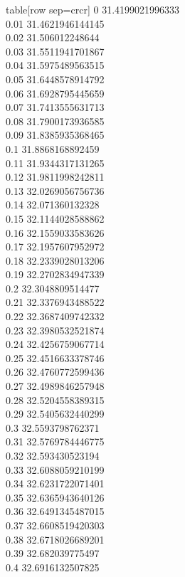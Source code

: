   table[row sep=crcr]{%
0	31.4199021996333\\
0.01	31.4621946144145\\
0.02	31.506012248644\\
0.03	31.5511941701867\\
0.04	31.5975489563515\\
0.05	31.6448578914792\\
0.06	31.6928795445659\\
0.07	31.7413555631713\\
0.08	31.7900173936585\\
0.09	31.8385935368465\\
0.1	31.8868168892459\\
0.11	31.9344317131265\\
0.12	31.9811998242811\\
0.13	32.0269056756736\\
0.14	32.071360132328\\
0.15	32.1144028588862\\
0.16	32.1559033583626\\
0.17	32.1957607952972\\
0.18	32.2339028013206\\
0.19	32.2702834947339\\
0.2	32.3048809514477\\
0.21	32.3376943488522\\
0.22	32.3687409742332\\
0.23	32.3980532521874\\
0.24	32.4256759067714\\
0.25	32.4516633378746\\
0.26	32.4760772599436\\
0.27	32.4989846257948\\
0.28	32.5204558389315\\
0.29	32.5405632440299\\
0.3	32.5593798762371\\
0.31	32.5769784446775\\
0.32	32.593430523194\\
0.33	32.6088059210199\\
0.34	32.6231722071401\\
0.35	32.6365943640126\\
0.36	32.6491345487015\\
0.37	32.6608519420303\\
0.38	32.6718026689201\\
0.39	32.682039775497\\
0.4	32.6916132507825\\
}
